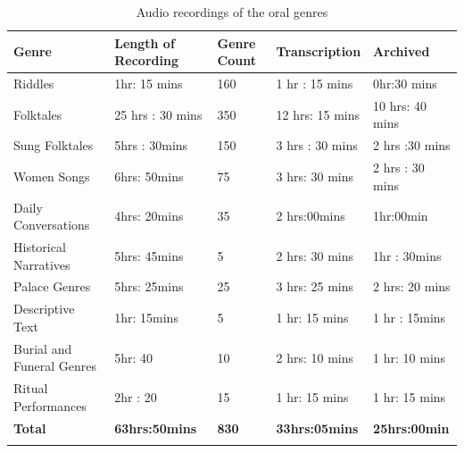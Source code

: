 \documentclass[output=paper,colorlinks,citecolor=brown]{langscibook}
\begin{document}
\begin{table}
   	\begin{tabular}{p{2.5cm} p{2.5cm} p{1cm} p{2.5cm} p{2.5cm}  }
    \lsptoprule
       \textbf{Genre} & \textbf{Length of Recording} & \textbf{Genre Count }& \textbf{Transcription} & \textbf{Archived} \\
\midrule
Riddles & 1hr: 15 mins & 160 & 1 hr : 15 mins & 0hr:30 mins \\
Folktales & 25 hrs : 30 mins & 350 & 12 hrs: 15 mins & 10 hrs: 40 mins\\
Sung Folktales & 5hrs : 30mins  & 150 & 3 hrs : 30 mins & 2 hrs :30 mins \\
Women Songs
& 6hrs: 50mins 
& 75
& 3 hrs: 30 mins
& 2 hrs : 30 mins \\
Daily Conversations
& 4hrs: 20mins 
& 35
& 2 hrs:00mins
& 1hr:00min \\
Historical Narratives
& 5hrs: 45mins 
& 5
& 2 hrs: 30 mins
& 1hr : 30mins \\
Palace Genres
& 5hrs: 25mins 
& 25
& 3 hrs: 25 mins
& 2 hrs: 20 mins \\
Descriptive Text
& 1hr: 15mins 
& 5
& 1 hr: 15 mins
& 1 hr : 15mins \\
Burial and Funeral Genres
& 5hr: 40 
& 10
& 2 hrs: 10 mins
& 1 hr: 10 mins \\
Ritual Performances
& 2hr : 20 
& 15
& 1 hr: 15 mins
& 1 hr: 15 mins \\
\midrule
\textbf{Total}
& \textbf{63hrs:50mins}
& \textbf{830}
& \textbf{33hrs:05mins}
& \textbf{25hrs:00min} \\
\lspbottomrule
    \end{tabular}
    \caption{Audio recordings of the oral genres}
    \label{tab:audio}
\end{table}
\end{document}
